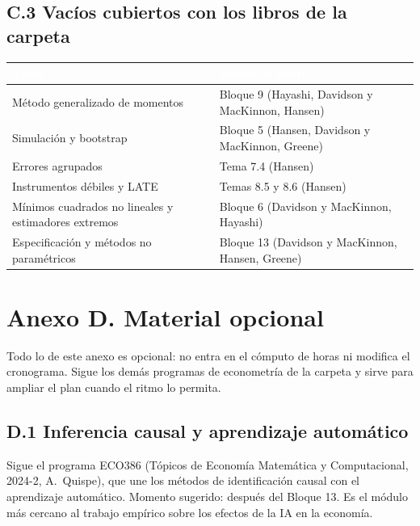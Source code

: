 \documentclass[11pt,a4paper]{article}
\newcommand{\cab}[1]{\textcolor{white}{\sffamily\bfseries #1}}
\newcommand{\filasalternas}{\rowcolors{2}{white}{tonoPalido}}
\begin{document}
\subsection*{C.3 Vacíos cubiertos con los libros de la carpeta}
{\small\filasalternas
\noindent\begin{tabularx}{\textwidth}{>{\raggedright\arraybackslash}p{5.6cm}X}
\toprule
\rowcolor{tonoOscuro}\cab{Vacío} & \cab{Dónde se cubre} \\
\midrule
Método generalizado de momentos & Bloque 9 (Hayashi, Davidson y MacKinnon, Hansen) \\
Simulación y bootstrap & Bloque 5 (Hansen, Davidson y MacKinnon, Greene) \\
Errores agrupados & Tema 7.4 (Hansen) \\
Instrumentos débiles y LATE & Temas 8.5 y 8.6 (Hansen) \\
Mínimos cuadrados no lineales y estimadores extremos & Bloque 6 (Davidson y MacKinnon, Hayashi) \\
Especificación y métodos no paramétricos & Bloque 13 (Davidson y MacKinnon, Hansen, Greene) \\
\bottomrule
\end{tabularx}
}

\section*{Anexo D. Material opcional}

Todo lo de este anexo es opcional: no entra en el cómputo de horas ni modifica
el cronograma. Sigue los demás programas de econometría de la carpeta y sirve
para ampliar el plan cuando el ritmo lo permita.

\subsection*{D.1 Inferencia causal y aprendizaje automático}
Sigue el programa ECO386 (Tópicos de Economía Matemática y Computacional,
2024-2, A.~Quispe), que une los métodos de identificación causal con el
aprendizaje automático. Momento sugerido: después del Bloque 13. Es el módulo
más cercano al trabajo empírico sobre los efectos de la IA en la economía.
\end{document}
